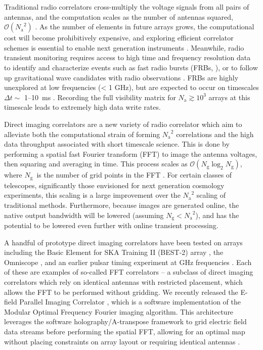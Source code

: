 \documentclass[a4paper,fleqn,usenatbib]{../mnras}
\newcommand{\Nant}{\ensuremath{N_{\mathrm{a}}}}
\newcommand{\Ng}{\ensuremath{N_{\mathrm{g}}}}
\begin{document}
Traditional radio correlators cross-multiply the voltage signals from all pairs of antennas, and the computation scales as the number of antennas squared, $\mathcal{O}(\Nant^2)$ \citep{bun04}. As the number of elements in future arrays grows, the computational cost will become prohibitively expensive, and exploring efficient correlator schemes is essential to enable next generation instruments \citep{lon00}. Meanwhile, radio transient monitoring requires access to high time and frequency resolution data to identify and characterize events such as fast radio bursts (FRBs, \citealt{lor07}), or to follow up gravitational wave candidates with radio observations \citep{abb16a,abb16b}. FRBs are highly unexplored at low frequencies (< 1 GHz), but are expected to occur on timescales $\Delta t \sim$ 1--10~ms \citep{tho13}. Recording the full visibility matrix for $\Nant \gtrsim 10^3$ arrays at this timescale leads to extremely high data write rates. 

Direct imaging correlators are a new variety of radio correlator which aim to alleviate both the computational strain of forming $\Nant^2$ correlations and the high data throughput associated with short timescale science. This is done by performing a spatial fast Fourier transform (FFT) to image the antenna voltages, then squaring and averaging in time. This process scales as $\mathcal{O}(\Ng \log_2 \Ng)$, where \Ng~is the number of grid points in the FFT \citep{mor11, teg09, teg10}. For certain classes of telescopes, significantly those envisioned for next generation cosmology experiments, this scaling is a large improvement over the $\Nant^2$ scaling of traditional methods. Furthermore, because images are generated online, the native output bandwidth will be lowered (assuming $\Ng < \Nant^2$), and has the potential to be lowered even further with online transient processing.

A handful of prototype direct imaging correlators have been tested on arrays including the Basic Element for SKA Training II (BEST-2) array \citep{fos14}, the Omniscope \citep{zhe14}, and an earlier pulsar timing experiment at GHz frequencies \citep{oto94, dai00}. Each of these are examples of so-called FFT correlators -- a subclass of direct imaging correlators which rely on identical antennas with restricted placement, which allows the FFT to be performed without gridding. We recently released the E-field Parallel Imaging Correlator \citep[EPIC;][]{thy15c}, which is a software implementation of the Modular Optimal Frequency Fourier \citep[MOFF;][]{mor11} imaging algorithm. This architecture leverages the software holography/A-transpose framework to grid electric field data streams before performing the spatial FFT, allowing for an optimal map without placing constraints on array layout or requiring identical antennas \citep{mor09,bha08,teg97a}.
\end{document}

